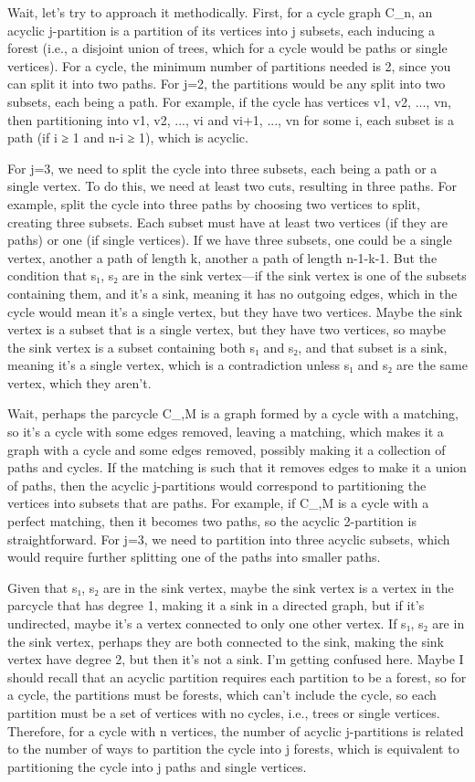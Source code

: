 Wait, let's try to approach it methodically. First, for a cycle graph C_n, an acyclic j-partition is a partition of its vertices into j subsets, each inducing a forest (i.e., a disjoint union of trees, which for a cycle would be paths or single vertices). For a cycle, the minimum number of partitions needed is 2, since you can split it into two paths. For j=2, the partitions would be any split into two subsets, each being a path. For example, if the cycle has vertices v1, v2, ..., vn, then partitioning into {v1, v2, ..., vi} and {vi+1, ..., vn} for some i, each subset is a path (if i ≥ 1 and n-i ≥ 1), which is acyclic. 

For j=3, we need to split the cycle into three subsets, each being a path or a single vertex. To do this, we need at least two cuts, resulting in three paths. For example, split the cycle into three paths by choosing two vertices to split, creating three subsets. Each subset must have at least two vertices (if they are paths) or one (if single vertices). If we have three subsets, one could be a single vertex, another a path of length k, another a path of length n-1-k-1. But the condition that {s₁, s₂} are in the sink vertex—if the sink vertex is one of the subsets containing them, and it's a sink, meaning it has no outgoing edges, which in the cycle would mean it's a single vertex, but they have two vertices. Maybe the sink vertex is a subset that is a single vertex, but they have two vertices, so maybe the sink vertex is a subset containing both s₁ and s₂, and that subset is a sink, meaning it's a single vertex, which is a contradiction unless s₁ and s₂ are the same vertex, which they aren't. 

Wait, perhaps the parcycle C_{,M} is a graph formed by a cycle with a matching, so it's a cycle with some edges removed, leaving a matching, which makes it a graph with a cycle and some edges removed, possibly making it a collection of paths and cycles. If the matching is such that it removes edges to make it a union of paths, then the acyclic j-partitions would correspond to partitioning the vertices into subsets that are paths. For example, if C_{,M} is a cycle with a perfect matching, then it becomes two paths, so the acyclic 2-partition is straightforward. For j=3, we need to partition into three acyclic subsets, which would require further splitting one of the paths into smaller paths. 

Given that {s₁, s₂} are in the sink vertex, maybe the sink vertex is a vertex in the parcycle that has degree 1, making it a sink in a directed graph, but if it's undirected, maybe it's a vertex connected to only one other vertex. If {s₁, s₂} are in the sink vertex, perhaps they are both connected to the sink, making the sink vertex have degree 2, but then it's not a sink. I'm getting confused here. Maybe I should recall that an acyclic partition requires each partition to be a forest, so for a cycle, the partitions must be forests, which can't include the cycle, so each partition must be a set of vertices with no cycles, i.e., trees or single vertices. Therefore, for a cycle with n vertices, the number of acyclic j-partitions is related to the number of ways to partition the cycle into j forests, which is equivalent to partitioning the cycle into j paths and single vertices. 

